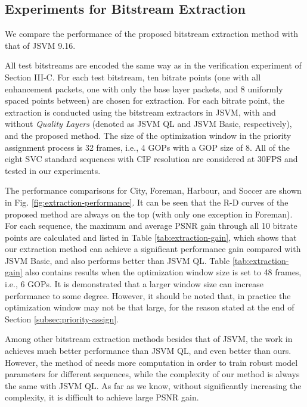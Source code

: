 \documentclass[journal]{IEEEtran}
\begin{document}
\subsection{Experiments for Bitstream Extraction}
\label{subsec:exp-extraction}

We compare the performance of the proposed bitstream extraction method with that of JSVM 9.16.

All test bitstreams are encoded the same way as in the verification experiment of Section III-C. For each test bitstream, ten bitrate points (one with all enhancement packets, one with only the base layer packets, and 8 uniformly spaced points between) are chosen for extraction. For each bitrate point, the extraction is conducted using the bitstream extractors in JSVM, with and without \textit{Quality Layers} (denoted as JSVM QL and JSVM Basic, respectively), and the proposed method. The size of the optimization window in the priority assignment process is 32 frames, i.e., 4 GOPs with a GOP size of 8. All of the eight SVC standard sequences with CIF resolution are considered at 30FPS and tested in our experiments.

The performance comparisons for City, Foreman, Harbour, and Soccer are shown in Fig. \ref{fig:extraction-performance}. It can be seen that the R-D curves of the proposed method are always on the top (with only one exception in Foreman). For each sequence, the maximum and average PSNR gain through all 10 bitrate points are calculated and listed in Table \ref{tab:extraction-gain}, which shows that our extraction method can achieve a significant performance gain compared with JSVM Basic, and also performs better than JSVM QL. Table \ref{tab:extraction-gain} also contains results when the optimization window size is set to 48 frames, i.e., 6 GOPs. It is demonstrated that a larger window size can increase performance to some degree. However, it should be noted that, in practice the optimization window may not be that large, for the reason stated at the end of Section \ref{subsec:priority-assign}.

Among other bitstream extraction methods besides that of JSVM, the work in \cite{Maani09} achieves much better performance than JSVM QL, and even better than ours. However, the method of \cite{Maani09} needs more computation in order to train robust model parameters for different sequences, while the complexity of our method is always the same with JSVM QL. As far as we know, without significantly increasing the complexity, it is difficult to achieve large PSNR gain.
\end{document}
